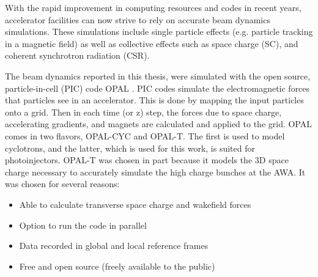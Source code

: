 \label{sec:code}


With the rapid improvement in computing resources and codes in recent years,  
accelerator facilities can now strive to rely on accurate beam dynamics simulations. 
These simulations include single particle effects 
(e.g. particle tracking in a magnetic field) as well as collective effects such as space charge (SC),  
and coherent synchrotron radiation (CSR).

The beam dynamics reported in this thesis, were simulated with 
the open source, particle-in-cell (PIC) code OPAL \cite{opal}. 
PIC codes simulate the electromagnetic forces that particles see in an accelerator. 
This is done by mapping the input particles onto a grid. 
Then in each time (or z) step, the forces due to space charge, accelerating gradients, 
and magnets are calculated and applied to the grid.
OPAL comes in two flavors, OPAL-CYC and OPAL-T. The first is used to model 
cyclotrons, and the latter, which is used for this work, is suited for photoinjectors. 
OPAL-T was chosen in part because it models the 3D space charge necessary to accurately simulate the high charge bunches at the AWA. 
It was chosen for several reasons:
\begin{itemize}
	\item Able to calculate transverse space charge and wakefield forces 
	\item Option to run the code in parallel
	\item Data recorded in global and local reference frames 
	\item Free and open source (freely available to the public)
\end{itemize} 

